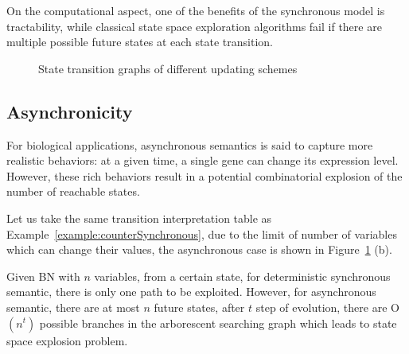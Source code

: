 On the computational aspect, one of the benefits of the synchronous model is tractability, while classical state space exploration algorithms fail if there are multiple possible future states at each state transition.


\begin{figure}[ht]
\caption[Update schemes]{State transition graphs of different updating schemes}\label{fig:updateScheme}
\end{figure}
\subsection{Asynchronicity}

For biological applications, asynchronous semantics is said to capture more realistic behaviors: at a given time, a single gene can change its expression level.
However, these rich behaviors result in a potential combinatorial explosion of the number of reachable states.

\begin{example}
Let us take the same transition interpretation table as Example~\ref{example:counterSynchronous}, due to the limit of number of variables which can change their values, the asynchronous case is shown in Figure~\ref{fig:updateScheme} (b).
\end{example}

Given BN with $n$ variables, from a certain state, for deterministic synchronous semantic, there is only one path to be exploited.
However, for asynchronous semantic, there are at most $n$ future states, after $t$ step of evolution, there are O$(n^t)$ possible branches in the arborescent searching graph which leads to state space explosion problem.

